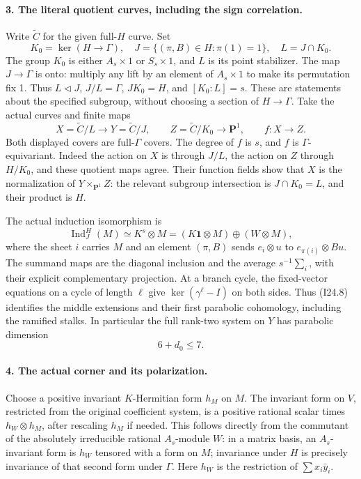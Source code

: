 \paragraph{3. The literal quotient curves, including the sign correlation.}
Write \(\widetilde C\) for the given full-\(H\) curve. Set
\[
 K_0=\ker(H\longrightarrow\Gamma),\quad
 J=\{(\pi,B)\in H:\pi(1)=1\},\quad L=J\cap K_0.
                                                               \tag{I24.6}
\]
The group \(K_0\) is either \(A_s\times1\) or \(S_s\times1\),
and \(L\) is its point stabilizer. The map \(J\to\Gamma\) is
onto: multiply any lift by an element of \(A_s\times1\) to make
its permutation fix 1. Thus \(L\lhd J\), \(J/L=\Gamma\),
\(JK_0=H\), and \([K_0:L]=s\). These are statements about
the specified subgroup, without choosing a section of \(H\to\Gamma\).
Take the actual curves and finite maps
\[
 X=\widetilde C/L\longrightarrow Y=\widetilde C/J,
 \qquad Z=\widetilde C/K_0\longrightarrow\mathbf P^1,
 \qquad f:X\longrightarrow Z.                              \tag{I24.7}
\]
Both displayed covers are full-\(\Gamma\) covers. The degree of
\(f\) is \(s\), and \(f\) is \(\Gamma\)-equivariant. Indeed
the action on \(X\) is through \(J/L\), the action on \(Z\)
through \(H/K_0\), and these quotient maps agree. Their function
fields show that \(X\) is the normalization of
\(Y\times_{\mathbf P^1} Z\): the relevant subgroup intersection
is \(J\cap K_0=L\), and their product is \(H\).

The actual induction isomorphism is
\[
 \operatorname{Ind}_J^H(M)
    \simeq K^s\otimes M=(K\mathbf1\otimes M)\oplus(W\otimes M),
                                                               \tag{I24.8}
\]
where the sheet \(i\) carries \(M\) and an element
\((\pi,B)\) sends \(e_i\otimes u\) to \(e_{\pi(i)}\otimes Bu\).
The summand maps are the diagonal inclusion and the average
\(s^{-1}\sum_i\), with their explicit complementary projection.
At a branch cycle, the fixed-vector equations on a cycle of length
\(\ell\) give \(\ker(\gamma^\ell-I)\) on both sides. Thus
(I24.8) identifies the middle extensions and their first parabolic
cohomology, including the ramified stalks. In particular the full
rank-two system on \(Y\) has parabolic dimension
\[
                              6+d_0\le7.                   \tag{I24.9}
\]

\paragraph{4. The actual corner and its polarization.}
Choose a positive invariant \(K\)-Hermitian form \(h_M\) on
\(M\). The invariant form on \(V\), restricted from the original
coefficient system, is a positive rational scalar times
\(h_W\otimes h_M\), after rescaling \(h_M\) if needed.
This follows directly from the commutant of the absolutely
irreducible rational \(A_s\)-module \(W\): in a matrix basis,
an \(A_s\)-invariant form is \(h_W\) tensored with a form on
\(M\); invariance under \(H\) is precisely invariance of that
second form under \(\Gamma\). Here \(h_W\) is the restriction
of \(\sum x_i\bar y_i\).

